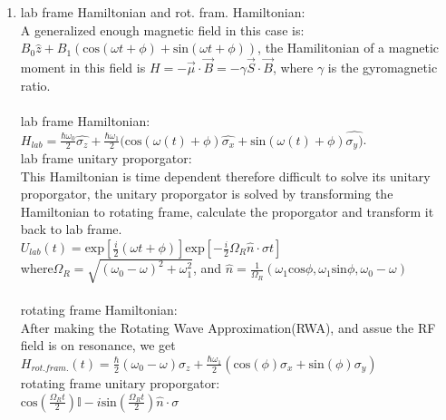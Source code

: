 \documentclass[11pt]{article}
\begin{document}
\begin{enumerate}[label=(\alph*)]
    \item lab frame Hamiltonian and rot. fram. Hamiltonian: \\
    A generalized enough magnetic field in this case is: $B_0 \hat{z} + B_1(\text{cos}(\omega t + \phi)+\text{sin}(\omega t + \phi))$, the Hamilitonian of a magnetic moment in this field is $H = -\vec{\mu}\cdot\vec{B} = -\gamma \vec{S}\cdot\vec{B}$, where $\gamma$ is the gyromagnetic ratio.\\
    \\
    lab frame Hamiltonian:\\
    $H_{lab} = \frac{\hbar \omega_0}{2}\hat{\sigma_z} + \frac{\hbar \omega_1}{2}(\text{cos}(\omega(t)+\phi)\hat{\sigma_x}+\text{sin}(\omega(t)+\phi)\hat{\sigma_y)}$.\\
    lab frame unitary proporgator: \\
    This Hamiltonian is time dependent therefore difficult to solve its unitary proporgator, the unitary proporgator is solved by transforming the Hamiltonian to rotating frame, calculate the proporgator and transform it back to lab frame.\\

    $U_{lab}(t) = \text{exp}[\frac{i}{2}(\omega t + \phi)]\text{exp}[-\frac{i}{2}\Omega_R\hat{n}\cdot \sigma t]$\\
    
    where$\Omega_R = \sqrt{(\omega_0 - \omega)^2 + \omega_1^2}$, and $\hat{n} = \frac{1}{\Omega_R}(\omega_1 \text{cos}\phi, \omega_1 \text{sin}\phi, \omega_0 - \omega)$\\
    \\
    rotating frame Hamiltonian: \\
    After making the Rotating Wave Approximation(RWA), and assue the RF field is on resonance, we get $H_{rot. fram.}(t) =\frac{\hbar}{2}(\omega_0 - \omega)\sigma_z + \frac{\hbar \omega_1}{2}(\text{cos}(\phi)\sigma_x+ \text{sin}(\phi)\sigma_y)$\\

    rotating frame unitary proporgator: \\
    $\text{cos}(\frac{\Omega_R t}{2})\mathbb{I} - i\text{sin}(\frac{\Omega_R t}{2})\hat{n}\cdot \sigma$\\


\end{enumerate}
\end{document}
